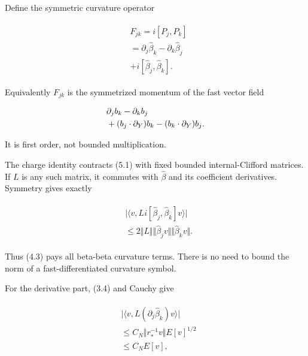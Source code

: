 Define the symmetric curvature operator

\begin{gather*}
\begin{aligned}
& F_{jk}=i[P_{j},P_{k}] \\
& =\partial _{j} \widehat{\beta}_{k}-\partial _{k} \widehat{\beta}_{j} \\
& +i[\widehat{\beta}_{j},\widehat{\beta}_{k}].
\end{aligned}\tag{5.1}
\end{gather*}

Equivalently \(F_{jk}\) is the symmetrized momentum of the fast vector
field

\begin{gather*}
\begin{aligned}
& \partial _{j} b_{k}-\partial _{k} b_{j} \\
& +(b_{j} \cdot  \partial _{Y})b_{k}-(b_{k} \cdot  \partial _{Y})b_{j}.
\end{aligned}\notag
\end{gather*}

It is first order, not bounded multiplication.

The charge identity contracts (5.1) with fixed bounded internal-Clifford
matrices. If \(L\) is any such matrix, it commutes with
\(\widehat{\beta}\) and its coefficient derivatives. Symmetry gives
exactly

\begin{gather*}
\begin{aligned}
& \vert \langle v,L i[\widehat{\beta}_{j},\widehat{\beta}_{k}]v\rangle \vert \\
& \le 2\Vert L\Vert  \Vert \widehat{\beta}_{j} v\Vert  \Vert \widehat{\beta}_{k} v\Vert .
\end{aligned}\tag{5.2}
\end{gather*}

Thus (4.3) pays all beta-beta curvature terms. There is no need to bound
the norm of a fast-differentiated curvature symbol.

For the derivative part, (3.4) and Cauchy give

\begin{gather*}
\begin{aligned}
& \vert \langle v,L(\partial _{j} \widehat{\beta}_{k})v\rangle \vert \\
& \le  C_{N} \Vert r_{*}^{-1} v\Vert  E[v]^{1/2} \\
& \le  C_{N} E[v],
\end{aligned}\tag{5.3}
\end{gather*}

